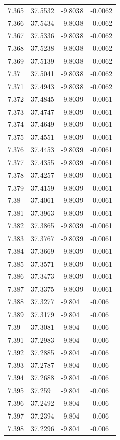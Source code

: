 \begin{tabular}{llll}
7.365 & 37.5532 & -9.8038 & -0.0062 \\
7.366 & 37.5434 & -9.8038 & -0.0062 \\
7.367 & 37.5336 & -9.8038 & -0.0062 \\
7.368 & 37.5238 & -9.8038 & -0.0062 \\
7.369 & 37.5139 & -9.8038 & -0.0062 \\
7.37 & 37.5041 & -9.8038 & -0.0062 \\
7.371 & 37.4943 & -9.8038 & -0.0062 \\
7.372 & 37.4845 & -9.8039 & -0.0061 \\
7.373 & 37.4747 & -9.8039 & -0.0061 \\
7.374 & 37.4649 & -9.8039 & -0.0061 \\
7.375 & 37.4551 & -9.8039 & -0.0061 \\
7.376 & 37.4453 & -9.8039 & -0.0061 \\
7.377 & 37.4355 & -9.8039 & -0.0061 \\
7.378 & 37.4257 & -9.8039 & -0.0061 \\
7.379 & 37.4159 & -9.8039 & -0.0061 \\
7.38 & 37.4061 & -9.8039 & -0.0061 \\
7.381 & 37.3963 & -9.8039 & -0.0061 \\
7.382 & 37.3865 & -9.8039 & -0.0061 \\
7.383 & 37.3767 & -9.8039 & -0.0061 \\
7.384 & 37.3669 & -9.8039 & -0.0061 \\
7.385 & 37.3571 & -9.8039 & -0.0061 \\
7.386 & 37.3473 & -9.8039 & -0.0061 \\
7.387 & 37.3375 & -9.8039 & -0.0061 \\
7.388 & 37.3277 & -9.804 & -0.006 \\
7.389 & 37.3179 & -9.804 & -0.006 \\
7.39 & 37.3081 & -9.804 & -0.006 \\
7.391 & 37.2983 & -9.804 & -0.006 \\
7.392 & 37.2885 & -9.804 & -0.006 \\
7.393 & 37.2787 & -9.804 & -0.006 \\
7.394 & 37.2688 & -9.804 & -0.006 \\
7.395 & 37.259 & -9.804 & -0.006 \\
7.396 & 37.2492 & -9.804 & -0.006 \\
7.397 & 37.2394 & -9.804 & -0.006 \\
7.398 & 37.2296 & -9.804 & -0.006 \\

\end{tabular}
